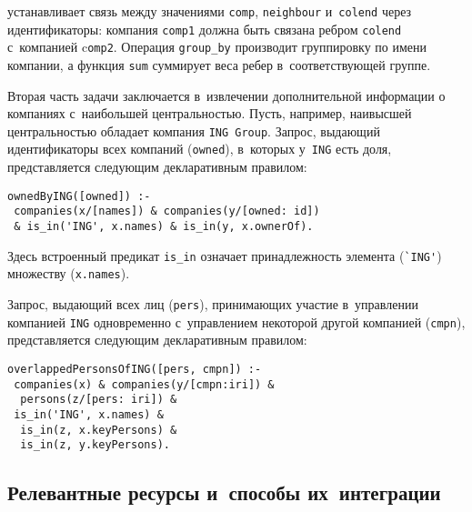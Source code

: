 \begin{multicols}{2}
\pagebreak

\noindent
 устанавливает связь между значениями \verb"comp", 
\verb"neighbour" и~\verb"colend" через идентификаторы: компания \verb"comp1" 
должна быть связана ребром \verb"colend" с~компанией c\verb"omp2". Операция 
\verb"group_by" производит группировку по имени компании, а функция 
\verb"sum" суммирует веса ребер в~соответствующей группе.
{

}


      
      Вторая часть задачи заключается в~извлечении дополнительной 
информации о компаниях с~наибольшей центральностью. Пусть, например, 
наивысшей центральностью обладает компания \verb"ING Group". Запрос, 
выдающий идентификаторы всех компаний (\verb"owned"), в~которых 
у~\verb"ING" есть доля, представляется следующим декларативным правилом:

\vspace*{-2pt}

      {\small
      \begin{verbatim}
ownedByING([owned]) :-
 companies(x/[names]) & companies(y/[owned: id]) 
 & is_in('ING', x.names) & is_in(y, x.ownerOf).
\end{verbatim}
}

\vspace*{-2pt}

\noindent
      Здесь встроенный предикат \verb"is_in" означает принадлежность 
элемента (\verb"`ING'") множеству (\verb"x.names").
      
      Запрос, выдающий всех лиц (\verb"pers"), прини\-мающих участие 
в~управлении компанией \verb"ING" одновремен\-но с~управлением некоторой 
другой компанией (\verb"cmpn"), представляется следующим декларативным 
правилом:

\vspace*{-2pt}

      {\small
      \begin{verbatim}
overlappedPersonsOfING([pers, cmpn]) :-
 companies(x) & companies(y/[cmpn:iri]) &
  persons(z/[pers: iri]) &
 is_in('ING', x.names) &
  is_in(z, x.keyPersons) &
  is_in(z, y.keyPersons).
\end{verbatim}
}

\vspace*{-6pt}

\subsection{Релевантные ресурсы и~способы их~интеграции}


\end{multicols}
